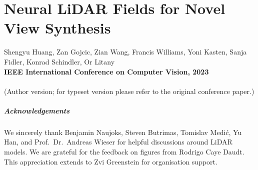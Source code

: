 \chapter[Neural LiDAR Fields for Novel View Synthesis]{Neural LiDAR Fields for Novel View Synthesis}
\label{chap:iccv23}

Shengyu Huang, Zan Gojcic, Zian Wang, Francis Williams, Yoni Kasten, Sanja Fidler, Konrad Schindler, Or Litany\\
\textbf{IEEE International Conference on Computer Vision, 2023}\\
\\
(Author version; for typeset version please refer to the original conference paper.)\\

\providecommand{\subdir}{.}
\graphicspath{{\subdir/}}


\newpage







\paragraph{Acknowledgements}
{We sincerely thank Benjamin Naujoks, Steven Butrimas, Tomislav Medić, Yu Han, and Prof.~Dr.~Andreas Wieser for helpful discussions around LiDAR models. We are grateful for the feedback on figures from Rodrigo Caye Daudt. This appreciation extends to Zvi Greenstein for organisation support.}


\newpage
\newcommand{\manuallabel}[2]{\def\@currentlabel{#2}\label{#1}}
\makeatother
\manuallabel{eq:loss_function}{Eq.~(15)}

